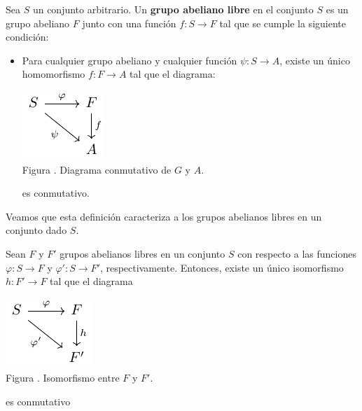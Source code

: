 \documentclass[12pt]{report}
\theoremstyle{largebreak}
\newcommand\cf[3]{\ensuremath{#1:#2\rightarrow#3}}
\newcounter{figcount}
\begin{document}
    \begin{mydef}
        Sea $S$ un conjunto arbitrario. Un \textbf{grupo abeliano libre} en el conjunto $S$ es un grupo abeliano $F$ junto con una función $\cf{f}{S}{F}$ tal que se cumple la siguiente condición:
        \begin{itemize}
            \item Para cualquier grupo abeliano y cualquier función $\cf{\psi}{S}{A}$, existe un único homomorfismo $\cf{f}{F}{A}$ tal que el diagrama:
            
            \begin{minipage}{\textwidth}
                \begin{center}
                    \includegraphics[scale=1.5]{images/fig_2.pdf}\\
                    Figura \thefigcount. Diagrama conmutativo de $G$ y $A$.
                \end{center}
            \end{minipage}
            
            es conmutativo.
        \end{itemize}
    \end{mydef}

    Veamos que esta definición caracteriza a los grupos abelianos libres en un conjunto dado $S$.

    \begin{propo}
        Sean $F$ y $F'$ grupos abelianos libres en un conjunto $S$ con respecto a las funciones $\cf{\varphi}{S}{F}$ y $\cf{\varphi'}{S}{F'}$, respectivamente. Entonces, existe un único isomorfismo $\cf{h}{F'}
        {F}$ tal que el diagrama
        
        \begin{minipage}{\textwidth}
            \begin{center}
                \includegraphics[scale=1.5]{images/fig_6.pdf}\\
                Figura \thefigcount. Isomorfismo entre $F$ y $F'$.
            \end{center}
        \end{minipage}

        es conmutativo
    \end{propo}
\end{document}
